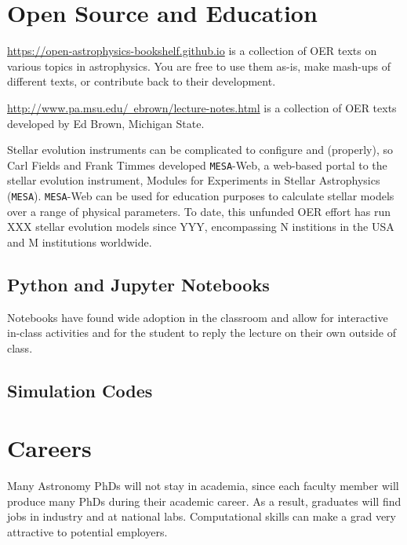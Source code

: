 \documentclass[11pt]{article}
\begin{document}
\section{Open Source and Education}

\href{https://open-astrophysics-bookshelf.github.io}{https://open-astrophysics-bookshelf.github.io}
is a collection of OER texts on various
topics in astrophysics. You are free to use them as-is, make mash-ups
of different texts, or contribute back to their development.

\href{http://www.pa.msu.edu/~ebrown/lecture-notes.html}{http://www.pa.msu.edu/~ebrown/lecture-notes.html}
is a collection of OER texts developed by Ed Brown, Michigan State.


Stellar evolution instruments can be complicated to configure and
(properly), so Carl Fields and Frank Timmes developed {\tt MESA}-Web,
a web-based portal to the stellar evolution instrument, Modules for
Experiments in Stellar Astrophysics ({\tt MESA}).  {\tt MESA}-Web can
be used for education purposes to calculate stellar models over a
range of physical parameters.  To date, this unfunded OER effort has
run XXX stellar evolution models since YYY, encompassing N institions
in the USA and M institutions worldwide.



\subsection{Python and Jupyter Notebooks}

Notebooks have found wide adoption in the classroom and allow for
interactive in-class activities and for the student to reply the
lecture on their own outside of class.

\subsection{Simulation Codes}




\section{Careers}

Many Astronomy PhDs will not stay in academia, since each faculty member
will produce many PhDs during their academic career.  As a result, graduates
will find jobs in industry and at national labs.  Computational skills 
can make a grad very attractive to potential employers.
\end{document}
